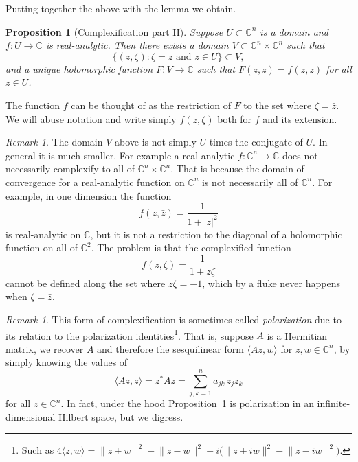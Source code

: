 \documentclass[12pt,openany]{book}
\newcommand{\linnprod}[2]{\langle #1 , #2 \rangle}
\newcommand{\sabs}[1]{\lvert {#1} \rvert}
\newcommand{\snorm}[1]{\lVert {#1} \rVert}
\newcommand{\C}{{\mathbb{C}}}
\newcommand{\myindex}[1]{#1\index{#1}}
\theoremstyle{plain}
\newtheorem{prop}[thm]{Proposition}
\theoremstyle{remark}
\newtheorem{remark}[thm]{Remark}
\theoremstyle{definition}
\theoremstyle{exercise}
\theoremstyle{example}
\newcommand{\propref}[1]{\hyperref[#1]{Proposition~\ref*{#1}}}
\begin{document}
Putting together the above with the lemma we obtain.

\begin{prop}[Complexification part II] \label{prop:complexificationpt2}
Suppose $U \subset \C^n$ is a domain and $f \colon U \to \C$ is
real-analytic.
Then there exists a domain $V \subset \C^n \times \C^n$ such that
\begin{equation*}
\bigl\{ (z,\zeta) : \zeta = \bar{z} \text{ and } z \in U \bigr\} \subset V ,
\end{equation*}
and a unique holomorphic function $F \colon V \to \C$ such that
$F(z,\bar{z}) = f(z,\bar{z})$ for all $z \in U$.
\end{prop}

The function $f$ can be thought of as the restriction of $F$ to the set
where $\zeta = \bar{z}$.  We will abuse notation and write
simply $f(z,\zeta)$ both for $f$ and its extension.

\begin{remark}
The domain $V$ above is not simply $U$ times the conjugate of $U$.  In
general it is much smaller.  For example a real-analytic $f \colon \C^n \to
\C$ does not necessarily complexify to all of $\C^n \times \C^n$.  That is
because the domain of convergence for a real-analytic function on $\C^n$
is not necessarily all of $\C^n$.  For example, in one dimension
the function
\begin{equation*}
f(z,\bar{z})
= \frac{1}{1+\sabs{z}^2}
\end{equation*}
is real-analytic on $\C$, but it is not a restriction to the diagonal
of a holomorphic function on all of $\C^2$.  The problem is that the complexified
function
\begin{equation*}
f(z,\zeta)
= \frac{1}{1+z \zeta}
\end{equation*}
cannot be defined along the set where $z \zeta = -1$, which by a fluke
never happens when $\zeta = \bar{z}$.
\end{remark}

\begin{remark}
This form of complexification is sometimes called
\emph{\myindex{polarization}} due to its relation to the polarization
identities\footnote{Such as $4 \linnprod{z}{w} =
\snorm{z+w}^2-\snorm{z-w}^2 +i \bigl( \snorm{z+iw}^2 - \snorm{z-iw}^2 \bigr)$.}.  That is, suppose $A$ is a Hermitian matrix, we 
recover $A$ and therefore the sesquilinear form $\linnprod{Az}{w}$ for
$z,w\in \C^n$, by simply knowing the values of
\begin{equation*}
\linnprod{Az}{z} = z^*Az = \sum_{j,k=1}^n a_{jk} \, \bar{z}_j z_k 
\end{equation*}
for all $z \in \C^n$.  In fact, under the hood \propref{prop:complexificationpt2} is
polarization in an infinite-dimensional Hilbert space, but we digress.
\end{remark}
\end{document}
